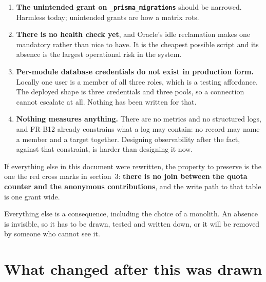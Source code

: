 \documentclass[11pt,a4paper]{article}
\begin{document}
\begin{enumerate}[leftmargin=*,itemsep=1.5mm]
\item \textbf{The unintended grant on \texttt{\_prisma\_migrations}} should be
  narrowed. Harmless today; unintended grants are how a matrix rots.

\item \textbf{There is no health check yet}, and Oracle's idle reclamation
  makes one mandatory rather than nice to have. It is the cheapest possible
  script and its absence is the largest operational risk in the system.

\item \textbf{Per-module database credentials do not exist in production
  form.} Locally one user is a member of all three roles, which is a testing
  affordance. The deployed shape is three credentials and three pools, so a
  connection cannot escalate at all. Nothing has been written for that.

\item \textbf{Nothing measures anything.} There are no metrics and no
  structured logs, and FR-B12 already constrains what a log may contain: no
  record may name a member and a target together. Designing observability after
  the fact, against that constraint, is harder than designing it now.
\end{enumerate}

\vfill
\begin{center}
\begin{tcolorbox}[width=0.94\textwidth,colback=studenslt,colframe=studens,
  arc=2pt,fonttitle=\sffamily\bfseries,title={The one thing to keep}]
\sffamily\small
If everything else in this document were rewritten, the property to preserve is
the one the red cross marks in section~3: \textbf{there is no join between the
quota counter and the anonymous contributions}, and the write path to that table
is one grant wide.

Everything else is a consequence, including the choice of a monolith. An absence
is invisible, so it has to be drawn, tested and written down, or it will be
removed by someone who cannot see it.
\end{tcolorbox}
\end{center}

\newpage
\section{What changed after this was drawn}
\end{document}
